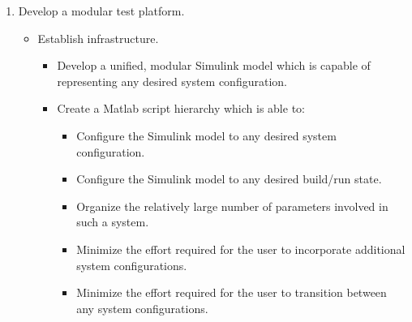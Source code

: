 \documentclass[crop=false,float=true,class=scrreprt]{standalone}
\begin{document}
\begin{enumerate}[leftmargin=*]
\begin{itemize}[leftmargin=*]
\begin{itemize}[leftmargin=*, label=$\vcenter{\hbox{\tiny$\bullet$}}$]
  \end{itemize}
  
\end{itemize}


\item Develop a modular test platform.
\begin{itemize}[leftmargin=*]

  \item Establish infrastructure.
  \begin{itemize}[leftmargin=*, label=$\vcenter{\hbox{\tiny$\bullet$}}$]

    \item Develop a unified, modular Simulink model which is capable of representing any desired system configuration.
    
    \item Create a Matlab script hierarchy which is able to:
    \begin{itemize}[leftmargin=*, label=$\cdot$]
    
      \item Configure the Simulink model to any desired system configuration.
      
      \item Configure the Simulink model to any desired build/run state.
      
      \item Organize the relatively large number of parameters involved in such a system. 
      
      \item Minimize the effort required for the user to incorporate additional system configurations.
    
      \item Minimize the effort required for the user to transition between any system configurations.
    
    \end{itemize}
        
  \end{itemize}
  

\end{itemize}
\end{enumerate}
\end{document}
